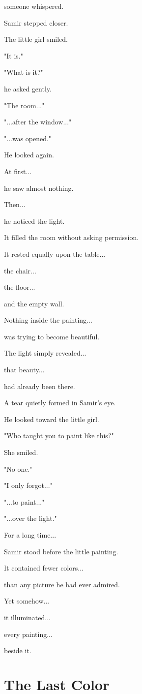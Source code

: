 \documentclass[12pt,openany]{book}
\begin{document}
someone whispered.

Samir stepped closer.

The little girl smiled.

"It is."

"What is it?"

he asked gently.

"The room..."

"...after the window..."

"...was opened."

He looked again.

At first...

he saw almost nothing.

Then...

he noticed the light.

It filled the room without asking permission.

It rested equally upon the table...

the chair...

the floor...

and the empty wall.

Nothing inside the painting...

was trying to become beautiful.

The light simply revealed...

that beauty...

had already been there.

A tear quietly formed in Samir's eye.

He looked toward the little girl.

"Who taught you to paint like this?"

She smiled.

"No one."

"I only forgot..."

"...to paint..."

"...over the light."

For a long time...

Samir stood before the little painting.

It contained fewer colors...

than any picture he had ever admired.

Yet somehow...

it illuminated...

every painting...

beside it.
\section*{The Last Color}
\end{document}
